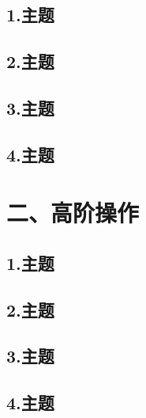 \documentclass[12pt,aspectratio=169,mathserif]{beamer}
\begin{document}
\subsection{1.主题}
\subsection{2.主题}
\subsection{3.主题}
\subsection{4.主题}

\section{二、高阶操作}
\subsection{1.主题}
\subsection{2.主题}
\subsection{3.主题}
\subsection{4.主题}
\end{document}
